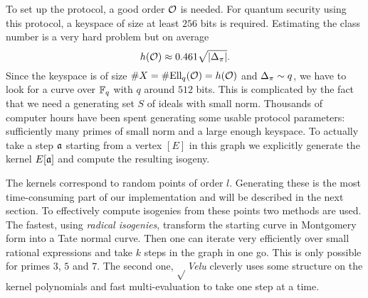 \documentclass[../main/main.tex]{subfiles}
\begin{document}
To set up the protocol, a good order $\mathcal{O}$ is needed.
For quantum security using this protocol, a keyspace of size at least $256$ bits is required.
Estimating the class number is a very hard problem but on average
\[
	h(\mathcal{O}) \approx 0.461\sqrt{\left|\Delta_{\pi}\right|}.
\]
Since the keyspace is of size $\# X= \# \text{Ell}_q(\mathcal{O}) = h(\mathcal{O})$ and $\Delta_{\pi}\sim q$, we have to look for a curve over $\mathbb{F}_q$ with $q$ around $512$ bits.
This is complicated by the fact that we need a generating set $S$ of ideals with small norm.
Thousands of computer hours have been spent generating some usable protocol parameters: sufficiently many primes of small norm and a large enough keyspace.
To actually take a step $\mathfrak{a}$ starting from a vertex $[E]$ in this graph we explicitly generate the kernel $E[\mathfrak{a}]$ and compute the resulting isogeny.

The kernels correspond to random points of order $l$.
Generating these is the most time-consuming part of our implementation and will be described in the next section.
To effectively compute isogenies from these points two methods are used.
The fastest, using \textit{radical isogenies}, transform the starting curve in Montgomery form into a Tate normal curve.
Then one can iterate very efficiently over small rational expressions and take $k$ steps in the graph in one go.
This is only possible for primes $3$, $5$ and $7$.
The second one, $\sqrt{}$\textit{Velu} cleverly uses some structure on the kernel polynomials and fast multi-evaluation to take one step at a time.
\end{document}
